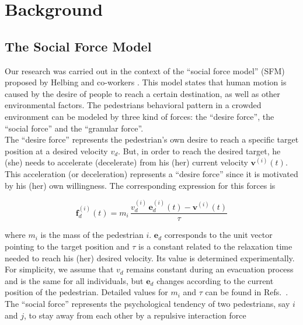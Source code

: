\section{\label{background}Background}

\subsection{\label{sfm}The Social Force Model}

Our research was carried out in the context of the ``social force model'' (SFM) 
proposed by Helbing and co-workers \cite{Helbing1}. This model states that human 
motion is caused by the desire of people to reach a certain destination, as 
well as other environmental factors. The pedestrians behavioral pattern in a 
crowded environment can be modeled by three kind of forces: the ``desire 
force'', the ``social force'' and the ``granular force''. \\

The ``desire force'' represents the pedestrian's own desire to reach a 
specific target position at a desired velocity $v_d$. But, in order to reach 
the desired target, he (she) needs to accelerate (decelerate) from his (her) 
current velocity $\mathbf{v}^{(i)}(t)$. This acceleration (or deceleration) 
represents a ``desire force'' since it is motivated by his (her) own 
willingness. The corresponding expression for this forces is 

\begin{equation}
        \mathbf{f}_d^ {(i)}(t) =  
m_i\,\displaystyle\frac{v_d^{(i)}\,\mathbf{e}_d^
{(i)}(t)-\mathbf{v}^{(i)}(t)}{\tau} \label{desired}
\end{equation}

\noindent where $m_i$ is the mass of the pedestrian $i$. $\mathbf{e}_d$ 
corresponds to the unit vector pointing to the target position and $\tau$ is a 
constant related to the relaxation time needed to reach his (her) desired 
velocity. Its value is determined experimentally. For simplicity, we assume that 
$v_d$ remains constant during an evacuation process and is the same for all 
individuals, but $\mathbf{e}_d$ changes according to the current position of the 
pedestrian. Detailed values for $m_i$ and $\tau$ can be found in 
Refs.~\cite{Helbing1,Dorso3}. \\

The ``social force'' represents the psychological tendency of two pedestrians,  
say $i$ and $j$, to stay away from each other by a repulsive interaction force 

